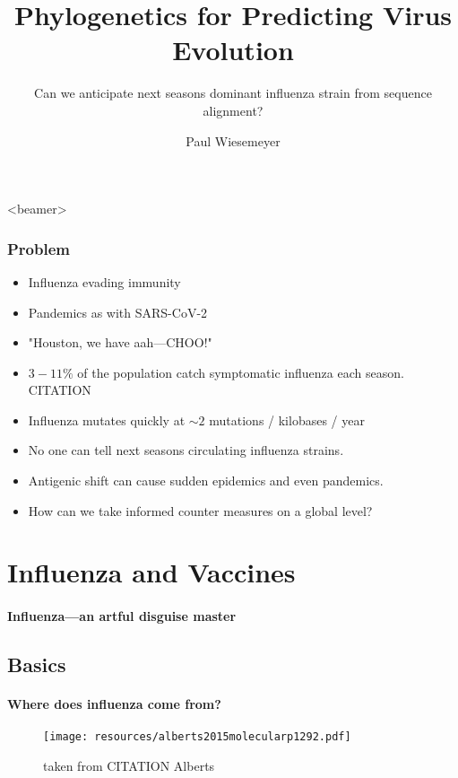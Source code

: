 \documentclass{beamer}
\title{Phylogenetics for Predicting Virus Evolution}
\subtitle{Can we anticipate next seasons dominant influenza strain from sequence alignment?}
\author{Paul Wiesemeyer}
\begin{document}
  \shorthandoff{-}
  \frame{\maketitle}

    
  \begin{darkframes}
  \begin{frame}<beamer>
    \frametitle{Problem}
    \begin{itemize}
      \item Influenza evading immunity
      \item Pandemics as with SARS-CoV-2
      \item "Houston, we have aah---CHOO!"
      \item $3 - 11 \% $ of the population catch symptomatic influenza each season. CITATION
      \item Influenza mutates quickly at $\sim 2$ mutations / kilobases / year
      \item No one can tell next seasons circulating influenza strains.
      \item Antigenic shift can cause sudden epidemics and even pandemics.
      \item How can we take informed counter measures on a global level?
    \end{itemize}
  \end{frame}

  \section{Influenza and Vaccines}

    \begin{frame}{\secname}
      \framesubtitle{Influenza---an artful disguise master}
    \end{frame}

    \subsection{Basics}
    \begin{frame}{\subsecname}
      \framesubtitle{Where does influenza come from?}
      \begin{figure}
        \texttt{[image: resources/alberts2015molecularp1292.pdf]}
        \caption{taken from CITATION Alberts}
      \end{figure}
    \end{frame}


\end{darkframes}
\end{document}
